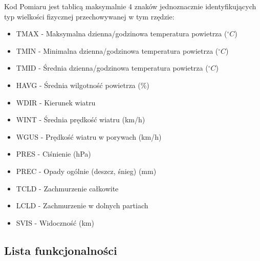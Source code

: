 \documentclass[12pt,a4paper]{article}
\begin{document}
Kod Pomiaru jest tablicą maksymalnie 4 znaków jednoznacznie identyfikujących typ wielkości fizycznej przechowywanej w tym rzędzie:
\begin{itemize}
\item TMAX - Maksymalna dzienna/godzinowa temperatura powietrza ($^\circ C$)
\item TMIN - Minimalna dzienna/godzinowa temperatura powietrza ($^\circ C$)
\item TMID - Średnia dzienna/godzinowa temperatura powietrza ($^\circ C$)
\item HAVG - Średnia wilgotność powietrza (\%)
\item WDIR - Kierunek wiatru
\item WINT - Średnia prędkość wiatru (km/h)
\item WGUS - Prędkość wiatru w porywach (km/h)
\item PRES - Ciśnienie (hPa)
\item PREC - Opady ogólnie (deszcz, śnieg) (mm)
\item TCLD - Zachmurzenie całkowite
\item LCLD - Zachmurzenie w dolnych partiach
\item SVIS - Widoczność (km)
\end{itemize}
\newpage
\subsection{Lista funkcjonalności}
\begin{table}[!htb]
\centering
\caption{Poziomy kompetencji klientów} 
\end{table}

\begin{table}[!htb]
\centering 
\end{table}
\end{document}
